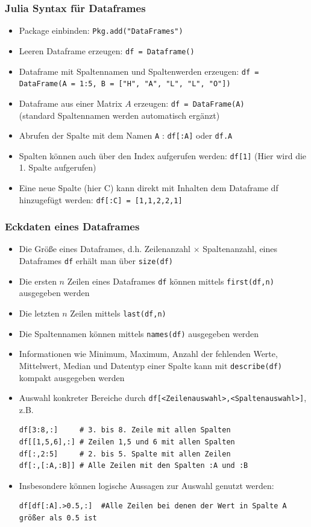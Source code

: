 \begin{frame}[fragile]
\frametitle{Julia Syntax für Dataframes}
\begin{itemize}[<+->]
\item Package einbinden: \verb+Pkg.add("DataFrames")+
\item Leeren Dataframe erzeugen: \verb+df = Dataframe()+
\item Dataframe mit Spaltennamen und Spaltenwerden erzeugen: \verb+df = DataFrame(A = 1:5, B = ["H", "A", "L", "L", "O"])+
\item Dataframe aus einer Matrix $A$ erzeugen: \verb+df = DataFrame(A)+ \\(standard Spaltennamen werden automatisch ergänzt) 
\item Abrufen der Spalte mit dem Namen \verb+A+ : \verb+df[:A]+ oder \verb+df.A+
\item Spalten können auch über den Index aufgerufen werden: \verb+df[1]+ (Hier wird die 1. Spalte aufgerufen)
\item Eine neue Spalte (hier C) kann direkt mit Inhalten dem Dataframe df hinzugefügt werden: \verb+df[:C] = [1,1,2,2,1]+
\end{itemize}
\end{frame}
\begin{frame}[fragile]
\frametitle{Eckdaten eines Dataframes}
\begin{itemize}[<+->]
\item Die Größe eines Dataframes, d.h. Zeilenanzahl $\times$ Spaltenanzahl, eines Dataframes \verb+df+ erhält man über \verb+size(df)+
\item Die ersten $n$ Zeilen eines Dataframes \verb+df+ können mittels \verb+first(df,n)+ ausgegeben werden
\item Die letzten $n$ Zeilen mittels \verb+last(df,n)+
\item Die Spaltennamen können mittels \verb+names(df)+ ausgegeben werden
\item Informationen wie Minimum, Maximum, Anzahl der fehlenden Werte, Mittelwert, Median und Datentyp einer Spalte kann mit \verb+describe(df)+ kompakt ausgegeben werden
\item Auswahl konkreter Bereiche durch \verb+df[<Zeilenauswahl>,<Spaltenauswahl>]+, z.B.
\begin{verbatim}
df[3:8,:]     # 3. bis 8. Zeile mit allen Spalten
df[[1,5,6],:] # Zeilen 1,5 und 6 mit allen Spalten
df[:,2:5]     # 2. bis 5. Spalte mit allen Zeilen
df[:,[:A,:B]] # Alle Zeilen mit den Spalten :A und :B
\end{verbatim}
\item Insbesondere können logische Aussagen zur Auswahl genutzt werden:
\begin{verbatim}
df[df[:A].>0.5,:]  #Alle Zeilen bei denen der Wert in Spalte A größer als 0.5 ist
\end{verbatim}
\end{itemize}
\end{frame}
